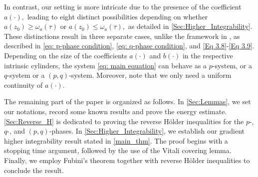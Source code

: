 \documentclass[11pt,oneside, english,reqno,twoside a4paper]{amsart}
\theoremstyle{definition}
\numberwithin{theorem}{section}
\numberwithin{equation}{section}
\begin{document}
In contrast, our setting is more intricate due to the presence of the coefficient $a(\cdot),$ leading to eight distinct possibilities depending on whether $a(z_0)\geq \omega_a(\tau)$ or $a(z_0)\leq \omega_a(\tau),$ as detailed in \cref{Sec:Higher_Integrability}. These distinctions result in three separate cases, unlike the framework in \cite{2023_Gradient_Higher_Integrability_for_Degenerate_Parabolic_Double-Phase_Systems}, as described in \eqref{eq: p-phase condition}, \eqref{eq: q-phase condition}, and \eqref{Eq 3.8}-\eqref{Eq 3.9}. Depending on the size of the coefficients $a(\cdot)$ and $b(\cdot)$ in the respective intrinsic cylinders, the system \eqref{eq: main equation} can behave as a $p$-system, or a $q$-system or a $(p, q)$-system. Moreover, note that we only need a uniform continuity of $a(\cdot).$



The remaining part of the paper is organized as follows.
In \cref{Sec:Lemmas}, we set our notations,  record some known results and prove the energy estimate.
\cref{Sec:Reverse_H} is dedicated to proving the reverse H\"{o}lder inequalities for the $p$-, $q$-, and $(p,q)$-phases.
In \cref{Sec:Higher_Integrability}, we establish our gradient higher integrability result stated in \cref{main_thm}. The proof begins with a stopping time argument, followed by the use of the Vitali covering lemma. Finally, we employ Fubini's theorem together with reverse H\"{o}lder inequalities to conclude the result.




\end{document}
